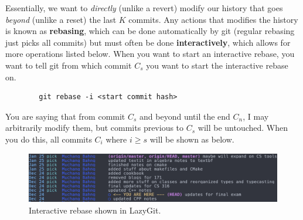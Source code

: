 \documentclass{article}
\begin{document}
    \begin{definition}[Rebasing]
      Essentially, we want to \textit{directly} (unlike a revert) modify our history that goes \textit{beyond} (unlike a reset) the last $K$ commits. Any actions that modifies the history is known as \textbf{rebasing}, which can be done automatically by git (regular rebasing just picks all commits) but must often be done \textbf{interactively}, which allows for more operations listed below. When you want to start an interactive rebase, you want to tell git from which commit $C_s$ you want to start the interactive rebase on. 
      \begin{lstlisting}
        git rebase -i <start commit hash>
      \end{lstlisting}
      You are saying that from commit $C_s$ and beyond until the end $C_n$, I may arbitrarily modify them, but commits previous to $C_s$ will be untouched. When you do this, all commits $C_i$ where $i \geq s$ will be shown as below. 

      \begin{figure}[H]
        \centering 
        \includegraphics[scale=0.3]{img/rebase.png}
        \caption{Interactive rebase shown in LazyGit.} 
        \label{fig:rebase}
      \end{figure}


\end{definition}
\end{document}
